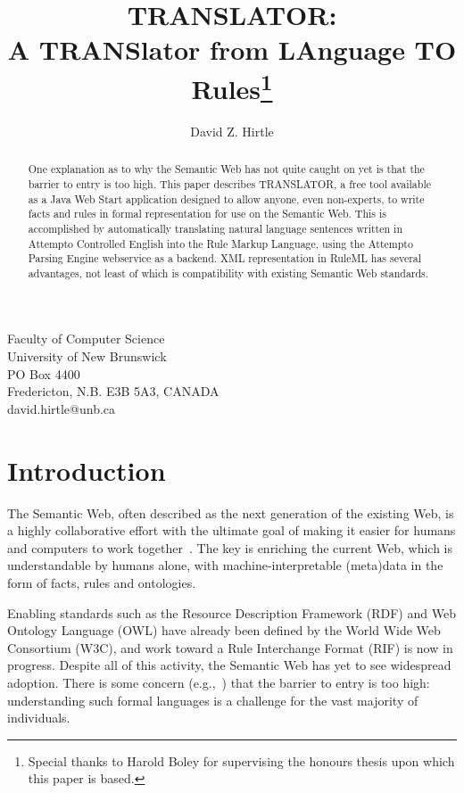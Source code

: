 \documentclass[12pt]{article}
\date{}
\newcommand{\lyxaddress}[1]{
   \par {\raggedright #1 
   \vspace{1.4em}
   \noindent\par}
 }
\begin{document}
\title{TRANSLATOR:\\A TRANSlator from LAnguage TO Rules\thanks{Special thanks to Harold Boley for supervising the honours thesis upon which this paper is based.}}
\author{David Z. Hirtle}

\maketitle


\lyxaddress{\begin{center}Faculty of Computer Science\\
University of New Brunswick\\
PO Box 4400\\
Fredericton, N.B. E3B 5A3, CANADA\\
david.hirtle@unb.ca\end{center}}

\begin{abstract}
One explanation as to why the Semantic Web has not quite caught on yet is that the barrier to entry is too high. This paper describes TRANSLATOR, a free tool available as a Java Web Start application designed to allow anyone, even non-experts, to write facts and rules in formal representation for use on the Semantic Web. This is accomplished by automatically translating natural language sentences written in Attempto Controlled English into the Rule Markup Language, using the Attempto Parsing Engine webservice as a backend. XML representation in RuleML has several advantages, not least of which is compatibility with existing Semantic Web standards.
\end{abstract}

\section{Introduction}
The Semantic Web, often described as the next generation of the existing Web, is a highly collaborative effort with the ultimate goal of making it easier for humans and computers to work together~\cite{berners-lee}. The key is enriching the current Web, which is understandable by humans alone, with machine-interpretable (meta)data in the form of facts, rules and ontologies.

Enabling standards such as the Resource Description Framework (RDF) and Web Ontology Language (OWL) have already been defined by the World Wide Web Consortium (W3C), and work toward a Rule Interchange Format (RIF) is now in progress. Despite all of this activity, the Semantic Web has yet to see widespread adoption. There is some concern (e.g.,~\cite{haustein}) that the barrier to entry is too high: understanding such formal languages is a challenge for the vast majority of individuals.
\end{document}
